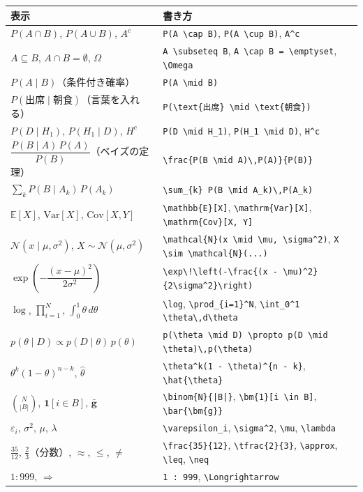 \documentclass[a4paper,dvipdfmx]{jsarticle}
\newcommand{\提出期限}{2026年11月9日（月）}
\newcommand{\学籍番号}{0000000}
\newcommand{\氏名}{氏名を書く}
\newcommand{\提出日}{2026年11月9日}
\begin{document}
\begin{center}
\small
\begin{tabular}{l|l}
\hline
表示 & 書き方 \\
\hline\hline
$P(A \cap B)$, $P(A \cup B)$, $A^c$ & \verb|P(A \cap B)|, \verb|P(A \cup B)|, \verb|A^c| \\
$A \subseteq B$, $A \cap B = \emptyset$, $\Omega$ & \verb|A \subseteq B|, \verb|A \cap B = \emptyset|, \verb|\Omega| \\
$P(A \mid B)$（条件付き確率） & \verb|P(A \mid B)| \\
$P(\text{出席} \mid \text{朝食})$（言葉を入れる） & \verb|P(\text{出席} \mid \text{朝食})| \\
$P(D \mid H_1)$, $P(H_1 \mid D)$, $H^c$ & \verb|P(D \mid H_1)|, \verb|P(H_1 \mid D)|, \verb|H^c| \\
$\dfrac{P(B \mid A)\,P(A)}{P(B)}$（ベイズの定理） & \verb|\frac{P(B \mid A)\,P(A)}{P(B)}| \\
$\sum_{k} P(B \mid A_k)\,P(A_k)$ & \verb|\sum_{k} P(B \mid A_k)\,P(A_k)| \\
$\mathbb{E}[X]$, $\mathrm{Var}[X]$, $\mathrm{Cov}[X, Y]$ & \verb|\mathbb{E}[X]|, \verb|\mathrm{Var}[X]|, \verb|\mathrm{Cov}[X, Y]| \\
$\mathcal{N}(x \mid \mu, \sigma^2)$, $X \sim \mathcal{N}(\mu, \sigma^2)$ & \verb|\mathcal{N}(x \mid \mu, \sigma^2)|, \verb|X \sim \mathcal{N}(...)| \\
$\exp\!\left(-\dfrac{(x - \mu)^2}{2\sigma^2}\right)$ & \verb|\exp\!\left(-\frac{(x - \mu)^2}{2\sigma^2}\right)| \\
$\log$, $\prod_{i=1}^N$, $\int_0^1 \theta\,d\theta$ & \verb|\log|, \verb|\prod_{i=1}^N|, \verb|\int_0^1 \theta\,d\theta| \\
$p(\theta \mid D) \propto p(D \mid \theta)\,p(\theta)$ & \verb|p(\theta \mid D) \propto p(D \mid \theta)\,p(\theta)| \\
$\theta^k(1 - \theta)^{n - k}$, $\hat{\theta}$ & \verb|\theta^k(1 - \theta)^{n - k}|, \verb|\hat{\theta}| \\
$\binom{N}{|B|}$, $\bm{1}[i \in B]$, $\bar{\bm{g}}$ & \verb+\binom{N}{|B|}+, \verb|\bm{1}[i \in B]|, \verb|\bar{\bm{g}}| \\
$\varepsilon_i$, $\sigma^2$, $\mu$, $\lambda$ & \verb|\varepsilon_i|, \verb|\sigma^2|, \verb|\mu|, \verb|\lambda| \\
$\frac{35}{12}$, $\tfrac{2}{3}$（分数）, $\approx$, $\leq$, $\neq$ & \verb|\frac{35}{12}|, \verb|\tfrac{2}{3}|, \verb|\approx|, \verb|\leq|, \verb|\neq| \\
$1 : 999$, $\Longrightarrow$ & \verb|1 : 999|, \verb|\Longrightarrow| \\
\hline
\end{tabular}
\end{center}
\end{document}
